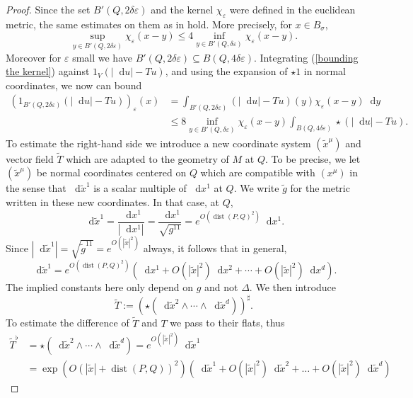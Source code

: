\documentclass[reqno,12pt,letterpaper]{amsart}
\newcommand*\dif{\mathop{}\!\mathrm{d}}
\DeclareMathOperator{\dist}{dist}
\theoremstyle{definition}
\numberwithin{equation}{section}
\begin{document}
\begin{proof}
Since the set $B'(Q, 2\delta\varepsilon)$ and the kernel $\chi_\varepsilon$ were defined in the euclidean metric, the same estimates on them as in \cite[Theorem 7.3]{Giusti77} hold. More precisely, for $x \in B_\sigma$,
\begin{equation}\label{bounding the kernel}
\sup_{y \in B'(Q, 2\delta\varepsilon)} \chi_\varepsilon(x - y) \leq 4 \inf_{y \in B'(Q, \delta\varepsilon)} \chi_\varepsilon(x - y).
\end{equation}
Moreover for $\varepsilon$ small we have $B'(Q, 2\delta\varepsilon) \subseteq B(Q, 4\delta\varepsilon)$.
Integrating (\ref{bounding the kernel}) against $1_V(|\dif u| - Tu)$, and using the expansion of $\star 1$ in normal coordinates, we now can bound
\begin{align*}
(1_{B'(Q, 2\delta\varepsilon)}(|\dif u| - Tu))_\varepsilon(x) &= \int_{B'(Q, 2\delta\varepsilon)} (|\dif u| - Tu)(y) \chi_\varepsilon(x - y) \dif y \\
&\leq 8 \inf_{y \in B'(Q, \delta\varepsilon)} \chi_\varepsilon(x - y) \int_{B(Q, 4\delta\varepsilon)} \star (|\dif u| - Tu).
\end{align*}
To estimate the right-hand side we introduce a new coordinate system $(\tilde x^\mu)$ and vector field $\tilde T$ which are adapted to the geometry of $M$ at $Q$.
To be precise, we let $(\tilde x^\mu)$ be normal coordinates centered on $Q$ which are compatible with $(x^\mu)$ in the sense that $\dif \tilde x^1$ is a scalar multiple of $\dif x^1$ at $Q$.
We write $\tilde g$ for the metric written in these new coordinates.
In that case, at $Q$,
$$\dif \tilde x^1 = \frac{\dif x^1}{|\dif x^1|} = \frac{\dif x^1}{\sqrt{g^{11}}} = e^{O(\dist(P, Q)^2)} \dif x^1.$$
Since $|\dif \tilde x^1| = \sqrt{\tilde g^{11}} = e^{O(|\tilde x|^2)}$ always, it follows that in general, 
$$\dif \tilde x^1 = e^{O(\dist(P, Q)^2)}\left(\dif x^1 + O(|\tilde x|^2) \dif x^2 + \cdots + O(|\tilde x|^2) \dif x^d\right).$$
The implied constants here only depend on $g$ and not $\Delta$.
We then introduce 
$$\tilde T := (\star (\dif \tilde x^2 \wedge \cdots \wedge \dif \tilde x^d))^\sharp.$$
To estimate the difference of $\tilde T$ and $T$ we pass to their flats, thus 
\begin{align*}
\tilde T^\flat &= \star(\dif \tilde x^2 \wedge \cdots \wedge \dif \tilde x^d) = e^{O(|\tilde x|^2)} \dif \tilde x^1 \\
&= \exp\left(O(|\tilde x| + \dist(P, Q))^2\right) \left(\dif \tilde x^1 + O(|\tilde x|^2) \dif \tilde x^2 + \dots + O(|\tilde x|^2) \dif \tilde x^d\right)

\end{align*}
\end{proof}
\end{document}

